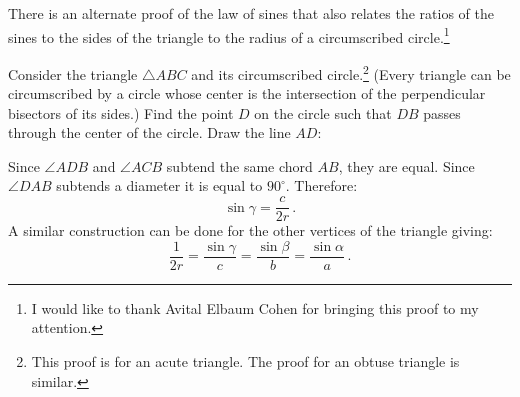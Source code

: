 \documentclass[11pt,a4paper]{article}
\begin{document}
There is an alternate proof of the law of sines that also relates the ratios of the sines to the sides of the triangle to the radius of a circumscribed circle.\footnote{I would like to thank Avital Elbaum Cohen for bringing this proof to my attention.}

Consider the triangle $\triangle ABC$ and its circumscribed circle.\footnote{This proof is for an acute triangle. The proof for an obtuse triangle is similar.} (Every triangle can be circumscribed by a circle whose center is the intersection of the perpendicular bisectors of its sides.) Find the point $D$ on the circle such that $DB$ passes through the center of the circle. Draw the line $AD$:

%
\begin{center}
\end{center}

Since $\angle ADB$ and $\angle ACB$ subtend the same chord $AB$, they are equal. Since $\angle DAB$ subtends a diameter it is equal to $90^\circ$. Therefore:
\[
\sin\gamma = \displaystyle \frac{c}{2r}\,.
\]
A similar construction can be done for the other vertices of the triangle giving:
\[
\frac{1}{2r} = \frac{\sin\gamma}{c} = \frac{\sin\beta}{b} = \frac{\sin\alpha}{a}\,.
\]
\end{document}
